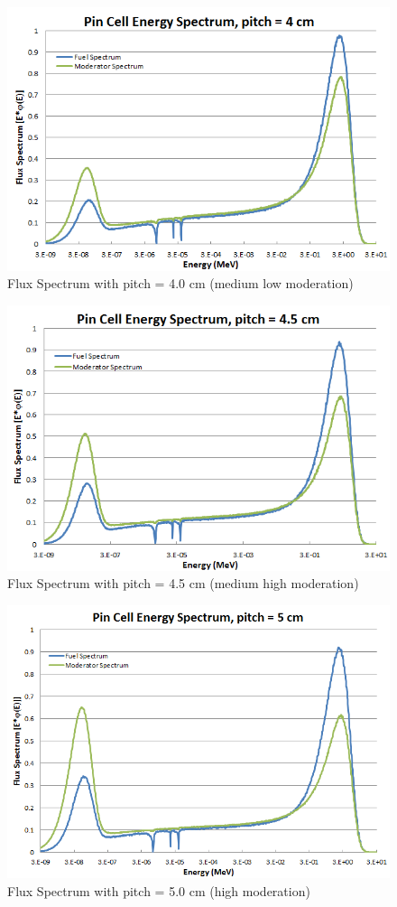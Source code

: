 \begin{figure}[H]
\centering
\includegraphics[width=0.8\linewidth]{images/spectrum_medlowmod.png}
\caption{Flux Spectrum with pitch = 4.0 cm (medium low moderation)}
\label{f:spectrummedlowmod}
\end{figure}

\begin{figure}[H]
\centering
\includegraphics[width=0.8\linewidth]{images/spectrum_medhighmod.png}
\caption{Flux Spectrum with pitch = 4.5 cm (medium high moderation)}
\label{f:spectrummedhighmod}
\end{figure}

\begin{figure}[H]
\centering
\includegraphics[width=0.8\linewidth]{images/spectrum_highmod.png}
\centering
\caption{Flux Spectrum with pitch = 5.0 cm (high moderation)}
\label{f:spectrumhighmod}
\end{figure}